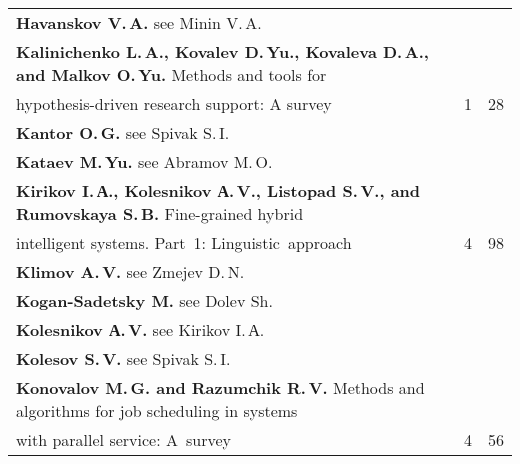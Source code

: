 {\begin{tabular}{p{399pt}rr}
\textbf{Havanskov V.\,A.} see Minin V.\,A.&&\\
\textbf{Kalinichenko L.\,A., Kovalev D.\,Yu., Kovaleva D.\,A., and Malkov O.\,Yu.}
Methods and tools for\linebreak
\\[-12pt]
\hspace*{21pt}hypothesis-driven research support: A survey&1&28\\
\textbf{Kantor O.\,G.} see Spivak S.\,I.&&\\
\textbf{Kataev M.\,Yu.} see Abramov M.\,O.&&\\
\textbf{Kirikov I.\,А., Kolesnikov А.\,V., Listopad S.\,V., and Rumovskaya S.\,B.}
Fine-grained hybrid\linebreak
\\[-12pt]
\hspace*{21pt}intelligent systems. Part~1: Linguistic~approach&4&98\\
\textbf{Klimov A.\,V.} see Zmejev D.\,N.&&\\
\textbf{Kogan-Sadetsky M.} see Dolev Sh.&&\\
\textbf{Kolesnikov А.\,V.} see Kirikov I.\,А.&&\\
\textbf{Kolesov S.\,V.} see Spivak S.\,I.&&\\
\textbf{Konovalov M.\,G. and Razumchik R.\,V.} Methods and algorithms for job
scheduling in systems\linebreak
\\[-12pt]
\hspace*{21pt}with parallel service: A~survey&4&56\\
\end{tabular}
}
\pagebreak

\def\leftfootline{\small{\textbf{\thepage}
\hfill INFORMATIKA I EE PRIMENENIYA~--- INFORMATICS AND APPLICATIONS\ \ \ 2015\
\ \ volume~9\ \ \ issue\ 4}
}%
 \def\rightfootline{\small{INFORMATIKA I EE PRIMENENIYA~---
INFORMATICS AND APPLICATIONS\ \ \ 2015\ \ \ volume~9\ \ \ issue\ 4
\hfill \textbf{\thepage}}}

\def\leftkol{2015 AUTHOR INDEX} %

\def\rightkol{2015 AUTHOR INDEX} %


